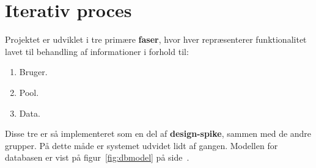 \section{Iterativ proces}


Projektet er udviklet i tre primære \textbf{faser}, hvor hver repræsenterer funktionalitet lavet til behandling af informationer i forhold til:

\begin{enumerate}
	\item Bruger.
	\item Pool.
	\item Data.
\end{enumerate}

Disse tre er så implementeret som en del af \textbf{design-spike}, sammen med de andre grupper. På dette måde er systemet udvidet lidt af gangen. Modellen for databasen er vist på figur~\ref{fig:dbmodel} på side~\pageref{fig:dbmodel}.


